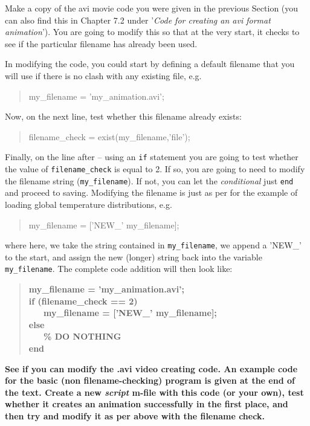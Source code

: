 \documentclass{tufte-book} %
\newenvironment{docspec}{\begin{quotation}\ttfamily\parskip0pt\parindent0pt\ignorespaces}{\end{quotation}}
\newenvironment{docspecbold}{\begin{quotation}\ttfamily\bfseries\parskip0pt\parindent0pt\ignorespaces}{\end{quotation}}
\begin{document}
Make a copy of the avi movie code you were given in the previous Section (you can also find this in Chapter 7.2 under '\textit{Code for creating an avi format animation}'). You are going to modify this so that at the very start, it checks to see if the particular filename has already been used.

In modifying the code, you could start by defining a default filename that you will use if there is no clash with any existing file, e.g.
\begin{docspec}
my\_filename = 'my\_animation.avi';
\end{docspec}
Now, on the next line, test whether this filename already exists:
\begin{docspec}
filename\_check = exist(my\_filename,'file');
\end{docspec}
Finally, on the line after -- using an \texttt{if} statement you are going to test whether the value of \texttt{filename\_check} is equal to 2. If so, you are going to need to modify the filename string (\texttt{my\_filename}). If not, you can let the \textit{conditional} just \texttt{end} and proceed to saving. Modifying the filename is just as per for the example of loading global temperature distributions, e.g.
\begin{docspec}
my\_filename = ['NEW\_' my\_filename];
\end{docspec}
where here, we take the string contained in \texttt{my\_filename}, we append a 'NEW\_' to the start, and assign the new (longer) string back into the variable \texttt{my\_filename}. The complete code addition will then look like:
\begin{docspecbold}
my\_filename = 'my\_animation.avi';
\\if (filename\_check == 2)
\\ \ \ \ my\_filename = ['NEW\_' my\_filename];
\\else
\\ \ \ \ \% DO NOTHING
\\end
\end{docspecbold}

\textbf{See if you can modify the \textsf{.avi} video creating code. An example code for the basic (non filename-checking) program is given at the end of the text. Create a new \textit{script} m-file with this code (or your own),  test whether it creates an animation successfully in the first place, and then try and modify it as per above with the filename check.} 
\end{document}
